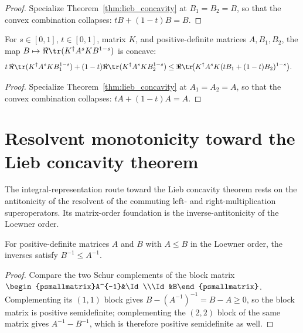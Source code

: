 \begin{proof}\leanok
    Specialize Theorem~\ref{thm:lieb_concavity} at $B_1=B_2=B$, so that
    the convex combination collapses: $tB+(1-t)B=B$.
\end{proof}

\begin{corollary}
    \label{cor:lieb_concavity_in_snd}
    \leanok
    For $s\in[0,1]$, $t\in[0,1]$, matrix $K$, and positive-definite matrices
    $A,B_1,B_2$, the map
    $B\mapsto\Re\tr(K^\dagger A^s K B^{1-s})$ is concave:
    \begin{align}
        t\,\Re\tr(K^\dagger A^s K B_1^{1-s})
        +(1-t)\Re\tr(K^\dagger A^s K B_2^{1-s})
        &\le
        \Re\tr\!\bigl(        K^\dagger A^s K(tB_1+(1-t)B_2)^{1-s}
        \bigr).
        \notag
    \end{align}
\end{corollary}

\begin{proof}\leanok
    Specialize Theorem~\ref{thm:lieb_concavity} at $A_1=A_2=A$, so that
    the convex combination collapses: $tA+(1-t)A=A$.
\end{proof}

\section{Resolvent monotonicity toward the Lieb concavity theorem}

The integral-representation route toward the Lieb concavity theorem rests on the
antitonicity of the resolvent of the commuting left- and right-multiplication
superoperators. Its matrix-order foundation is the inverse-antitonicity of the
Loewner order.

\begin{lemma}\label{lem:loewner_inv_antitone}
    \leanok
    For positive-definite matrices $A$ and $B$ with $A\le B$ in the Loewner
    order, the inverses satisfy $B^{-1}\le A^{-1}$.
\end{lemma}

\begin{proof}\leanok
    Compare the two Schur complements of the block matrix
    $\begin{psmallmatrix}A^{-1}&\Id\\\Id&B\end{psmallmatrix}$. Complementing its
    $(1,1)$ block gives $B-(A^{-1})^{-1}=B-A\ge0$, so the block matrix is
    positive semidefinite; complementing the $(2,2)$ block of the same matrix
    gives $A^{-1}-B^{-1}$, which is therefore positive semidefinite as well.
\end{proof}

